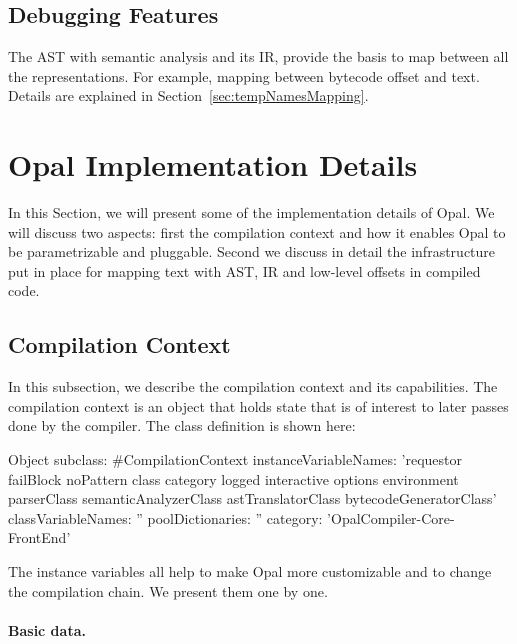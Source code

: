 \documentclass[preprint,10pt]{sigplanconf}
\begin{document}
\subsection{Debugging Features}

The AST with semantic analysis and its IR, provide the basis to map between all the representations. For example, mapping between bytecode offset and text. Details are explained in Section~\ref{sec:tempNamesMapping}.


\section{Opal Implementation Details}
\label{sec:implementation}

In this Section, we will present some of the implementation details of Opal. We will discuss two aspects: first the compilation context and how it enables Opal to be parametrizable and pluggable. Second we discuss in detail the infrastructure put in place for mapping text with AST, IR and low-level offsets in compiled code.

\subsection{Compilation Context}

In this subsection, we describe the compilation context and its capabilities. The compilation context is an object that holds state that is of interest to later passes done by the compiler. The class definition is shown here:

\begin{code}{}
Object subclass: #CompilationContext
    instanceVariableNames: 'requestor failBlock noPattern class 
                            category logged interactive options 
                            environment parserClass semanticAnalyzerClass 
                            astTranslatorClass bytecodeGeneratorClass'
    classVariableNames: ''
    poolDictionaries: ''
    category: 'OpalCompiler-Core-FrontEnd'
\end{code}

The instance variables all help to make Opal more customizable and to change the compilation chain. We present them one by one.

\paragraph{Basic data.}
\end{document}
